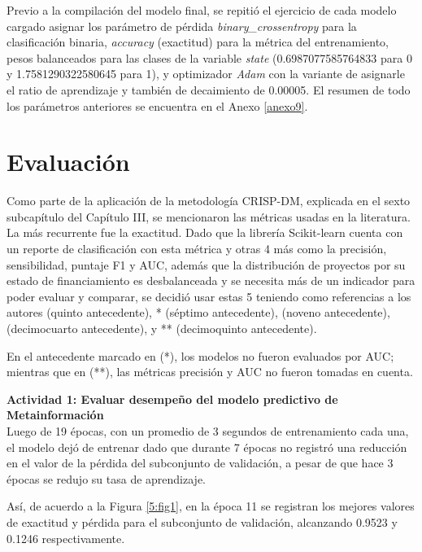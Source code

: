 Previo a la compilación del modelo final, se repitió el ejercicio de cada modelo cargado asignar los parámetro de pérdida \textit{binary\_crossentropy} para la clasificación binaria, \textit{accuracy} (exactitud) para la métrica del entrenamiento, pesos balanceados para las clases de la variable \textit{state} (0.6987077585764833 para 0 y 1.7581290322580645 para 1), y optimizador \textit{Adam} con la variante de asignarle el ratio de aprendizaje y también de decaimiento de 0.00005. El resumen de todo los parámetros anteriores se encuentra en el Anexo \ref{anexo9}.


\section{Evaluación}
Como parte de la aplicación de la metodología CRISP-DM, explicada en el sexto subcapítulo del Capítulo III, se mencionaron las métricas usadas en la literatura. La más recurrente fue la exactitud. Dado que la librería Scikit-learn cuenta con un reporte de clasificación con esta métrica y otras 4 más como la precisión, sensibilidad, puntaje F1 y AUC, además que la distribución de proyectos por su estado de financiamiento es desbalanceada y se necesita más de un indicador para poder evaluar y comparar, se decidió usar estas 5 teniendo como referencias a los autores \citeauthor{pr_beckwith2016predcrowd} (quinto antecedente), \citeauthor{pr_yuan2016textanalytics}* (séptimo antecedente), \citeauthor{pr_kaur2017socmedcrowd} (noveno antecedente), \citeauthor{pr_cheng2019deeplearning} (decimocuarto antecedente), y \citeauthor{pr_chen2019keywords_crowdfunding}** (decimoquinto antecedente).

En el antecedente marcado en (*), los modelos no fueron evaluados por AUC; mientras que en (**), las métricas precisión y AUC no fueron tomadas en cuenta.

\textbf{Actividad 1: Evaluar desempeño del modelo predictivo de Metainformación}
\\
Luego de 19 épocas, con un promedio de 3 segundos de entrenamiento cada una, el modelo dejó de entrenar dado que durante 7 épocas no registró una reducción en el valor de la pérdida del subconjunto de validación, a pesar de que hace 3 épocas se redujo su tasa de aprendizaje.

Así, de acuerdo a la Figura \ref{5:fig1}, en la época 11 se registran los mejores valores de exactitud y pérdida para el subconjunto de validación, alcanzando 0.9523 y 0.1246 respectivamente.


